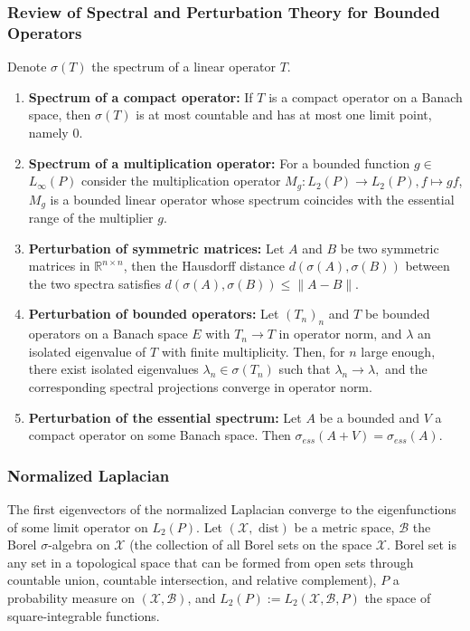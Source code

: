 {	\subsubsection{Review of Spectral and Perturbation Theory for Bounded Operators}
	
	Denote $\sigma(T)$ the spectrum of a linear operator $T$.
	
	\begin{enumerate}
		\item \textbf{Spectrum of a compact operator:} If $T$ is a compact operator on a Banach space, then $\sigma(T)$ is at most countable and has at most one limit point, namely 0.
		\item \textbf{Spectrum of a multiplication operator:} For a bounded function $g \in$ $L_{\infty}(P)$ consider the multiplication operator $M_{g}: L_{2}(P) \rightarrow L_{2}(P), f \mapsto g f$, $M_{g}$ is a bounded linear operator whose spectrum coincides with the essential range of the multiplier $g$.
		\item \textbf{Perturbation of symmetric matrices:} Let $A$ and $B$ be two symmetric matrices in $\mathbb{R}^{n\times n}$, then the Hausdorff distance $d(\sigma(A), \sigma(B))$ between the two spectra satisfies $d(\sigma(A), \sigma(B)) \leq\|A-B\|$.
		\item \textbf{Perturbation of bounded operators:} Let $\left(T_{n}\right)_{n}$ and $T$ be bounded operators on a Banach space $E$ with $T_{n} \rightarrow T$ in operator norm, and $\lambda$ an isolated eigenvalue of $T$ with finite multiplicity. Then, for $n$ large enough, there exist isolated eigenvalues $\lambda_{n} \in \sigma\left(T_{n}\right)$ such that $\lambda_{n} \rightarrow \lambda,$ and the corresponding spectral projections converge in operator norm.
		\item \textbf{Perturbation of the essential spectrum:} Let $A$ be a bounded and $V$ a compact operator on some Banach space. Then $\sigma_{e s s}(A+V)=\sigma_{e s s}(A)$.
	\end{enumerate}
	
	\subsubsection{Normalized Laplacian}
	
	The first eigenvectors of the normalized Laplacian converge to the eigenfunctions of some limit operator on $L_2 (P)$. Let $(\mathcal{X}, \text { dist})$ be a metric space, $\mathcal{B}$ the Borel $\sigma$-algebra on $\mathcal{X}$ (the collection of all Borel sets on the space $\mathcal{X}$. Borel set is any set in a topological space that can be formed from open sets through countable union, countable intersection, and relative complement), $P$ a probability measure on $(\mathcal{X}, \mathcal{B})$, and $L_{2}(P):=L_{2}(\mathcal{X}, \mathcal{B}, P)$ the space of square-integrable functions.
	
}
